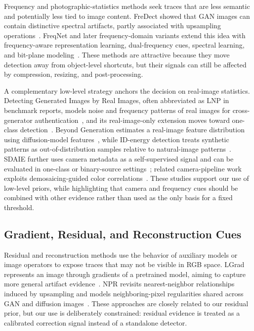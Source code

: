 \documentclass[lettersize,journal]{IEEEtran}
\begin{document}
Frequency and photographic-statistics methods seek traces that are less semantic and potentially less tied to image content. FreDect showed that GAN images can contain distinctive spectral artifacts, partly associated with upsampling operations~\cite{frank2020frequency}. FreqNet and later frequency-domain variants extend this idea with frequency-aware representation learning, dual-frequency cues, spectral learning, and bit-plane modeling~\cite{tan2024freqnet,yan2025dffreq,karageorgiou2025spai,wang2025lota}. These methods are attractive because they move detection away from object-level shortcuts, but their signals can still be affected by compression, resizing, and post-processing.

A complementary low-level strategy anchors the decision on real-image statistics. Detecting Generated Images by Real Images, often abbreviated as LNP in benchmark reports, models noise and frequency patterns of real images for cross-generator authentication~\cite{liu2022realimages}, and its real-image-only extension moves toward one-class detection~\cite{bi2023realonly}. Beyond Generation estimates a real-image feature distribution using diffusion-model features~\cite{zhong2025beyond}, while ID-energy detection treats synthetic patterns as out-of-distribution samples relative to natural-image patterns~\cite{cai2025generalizable}. SDAIE further uses camera metadata as a self-supervised signal and can be evaluated in one-class or binary-source settings~\cite{zhong2026metadata}; related camera-pipeline work exploits demosaicing-guided color correlations~\cite{zhong2026color}. These studies support our use of low-level priors, while highlighting that camera and frequency cues should be combined with other evidence rather than used as the only basis for a fixed threshold.

\subsection{Gradient, Residual, and Reconstruction Cues}
Residual and reconstruction methods use the behavior of auxiliary models or image operators to expose traces that may not be visible in RGB space. LGrad represents an image through gradients of a pretrained model, aiming to capture more general artifact evidence~\cite{tan2023lgrad}. NPR revisits nearest-neighbor relationships induced by upsampling and models neighboring-pixel regularities shared across GAN and diffusion images~\cite{tan2024npr}. These approaches are closely related to our residual prior, but our use is deliberately constrained: residual evidence is treated as a calibrated correction signal instead of a standalone detector.
\end{document}

